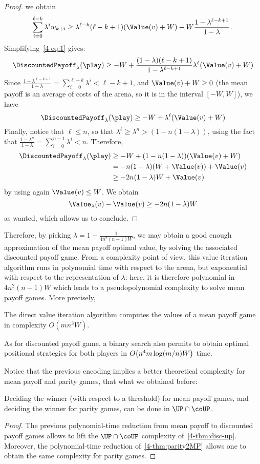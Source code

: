 \begin{proof}
  we obtain
  \[\sum_{i=0}^{\ell-k}\lambda^iw_{k+i}\geq
    \lambda^{\ell-k}(\ell-k+1)(\Value(v)+W)-
    W\frac{1-\lambda^{\ell-k+1}}{1-\lambda} \,.\]
  Simplifying~\cref{4-eq:1} gives:
  \[\DiscountedPayoff_\lambda(\play)
    \geq -W+ \frac{(1-\lambda)(\ell-k+1)}{1-\lambda^{\ell-k+1}}
    \lambda^\ell (\Value(v) + W)\] Since
  $\frac {1-\lambda^{\ell-k+1}}{1-\lambda} =
  \sum_{i=0}^{\ell-k}\lambda^i < \ell-k+1$, and $\Value(v) + W\geq 0$
  (the mean payoff is an average of costs of the arena, so it is in
  the interval $[-W,W]$), we have
  \[\DiscountedPayoff_\lambda(\play)
    \geq -W + \lambda^\ell (\Value(v) + W)\] Finally, notice that
  $\ell\leq n$, so that
  $\lambda^\ell\geq \lambda^{n}>(1-n(1-\lambda))$, using the fact
  that
  $\frac{1-\lambda^{n}}{1-\lambda} = \sum_{i=0}^{n-1}\lambda^i <
  n$. Therefore,
  \begin{align*}
    \DiscountedPayoff_\lambda(\play)
    &\geq -W + (1-n(1-\lambda)) (\Value(v) + W)\\
    &= -n(1-\lambda)(W+\Value(v)) + \Value(v)\\
    &\geq -2n(1-\lambda)W + \Value(v)
  \end{align*}
  by using again $\Value(v)\leq W$. We obtain
  \[\Value_\lambda(v)-\Value(v)\geq -2n(1-\lambda)W\]
  as wanted, which allows us to conclude. 
\end{proof}

Therefore, by picking $\lambda = 1-\frac 1{4n^2(n-1)W}$, we may
obtain a good enough approximation of the mean payoff optimal value,
by solving the associated discounted payoff game. From a complexity
point of view, this value iteration algorithm runs in polynomial time
with respect to the arena, but exponential with respect to the
representation of $\lambda$: here, it is therefore polynomial in
$4n^2(n-1)W$ which leads to a pseudopolynomial complexity to solve
mean payoff games. More precisely,

\begin{theorem}\label{4-thm:MP-direct-value-iteration}
  The direct value iteration algorithm computes the values of a
  mean payoff game in complexity $O(mn^3W)$.
\end{theorem}

As for discounted payoff game, a binary search also
permits to obtain optimal positional strategies for both players in
$O\big(n^4m\log(m/n)W\big)$ time.

Notice that the previous encoding implies a better theoretical
complexity for mean payoff and parity games, that what we obtained
before:
\begin{corollary}[Complexity]\label{4-col:UP}
  Deciding the winner (with respect to a threshold) for mean payoff
  games, and deciding the winner for parity games, can be done in
  $\UP\cap\coUP$.
\end{corollary}
\begin{proof}
  The previous polynomial-time reduction from mean payoff to
  discounted payoff games allows to lift the $\UP\cap\coUP$ complexity
  of~\cref{4-thm:disc-up}. Moreover, the polynomial-time reduction
  of~\cref{4-thm:parity2MP} allows one to obtain the same complexity for
  parity games. 
\end{proof}
